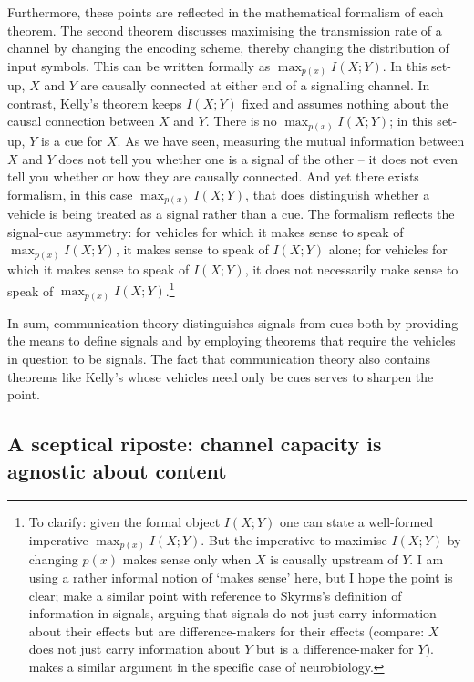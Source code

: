 \documentclass[12pt]{article}
\begin{document}
Furthermore, these points are reflected in the mathematical formalism of each theorem.
The second theorem discusses maximising the transmission rate of a channel by changing the encoding scheme, thereby changing the distribution of input symbols.
This can be written formally as $\max_{p(x)}I(X;Y)$.
In this set-up, $X$ and $Y$ are causally connected at either end of a signalling channel.
In contrast, Kelly's theorem keeps $I(X;Y)$ fixed and assumes nothing about the causal connection between $X$ and $Y$.
There is no $\max_{p(x)}I(X;Y)$; in this set-up, $Y$ is a cue for $X$.
As we have seen, measuring the mutual information between $X$ and $Y$ does not tell you whether one is a signal of the other -- it does not even tell you whether or how they are causally connected.
And yet there exists formalism, in this case $\max_{p(x)}I(X;Y)$, that does distinguish whether a vehicle is being treated as a signal rather than a cue.
The formalism reflects the signal-cue asymmetry: for vehicles for which it makes sense to speak of $\max_{p(x)}I(X;Y)$, it makes sense to speak of $I(X;Y)$ alone; for vehicles for which it makes sense to speak of $I(X;Y)$, it does not necessarily make sense to speak of $\max_{p(x)}I(X;Y)$.\footnote{To clarify: given the formal object $I(X;Y)$ one can state a well-formed imperative $\max_{p(x)}I(X;Y)$. But the imperative to maximise $I(X;Y)$ by changing $p(x)$ makes sense only when $X$ is causally upstream of $Y$. I am using a rather informal notion of `makes sense' here, but I hope the point is clear; \citet{calcott2020signals} make a similar point with reference to Skyrms's \citeyearpar{skyrms2010signals} definition of information in signals, arguing that signals do not just carry information about their effects but are difference-makers for their effects (compare: $X$ does not just carry information about $Y$ but is a difference-maker for $Y$). 
\citet{rathkopf2017neural} makes a similar argument in the specific case of neurobiology.}

In sum, communication theory distinguishes signals from cues both by providing the means to define signals and by employing theorems that require the vehicles in question to be signals.
The fact that communication theory also contains theorems like Kelly's whose vehicles need only be cues serves to sharpen the point.

\subsection{A sceptical riposte: channel capacity is agnostic about content}
\end{document}

